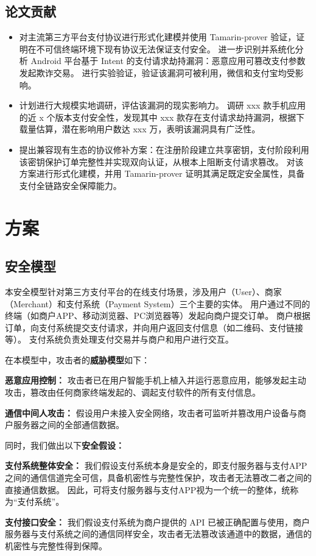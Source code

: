 \documentclass[UTF8]{ctexart}
\begin{document}
\subsection{论文贡献}
\begin{itemize}
    \item 对主流第三方平台支付协议进行形式化建模并使用 Tamarin-prover 验证，证明在不可信终端环境下现有协议无法保证支付安全。
        进一步识别并系统化分析 Android 平台基于 Intent 的支付请求劫持漏洞：恶意应用可篡改支付参数发起欺诈交易。
        进行实验验证，验证该漏洞可被利用，微信和支付宝均受影响。
    \item 计划进行大规模实地调研，评估该漏洞的现实影响力。
        调研 xxx 款手机应用的近 x 个版本支付安全性，发现其中 xxx 款存在支付请求劫持漏洞，根据下载量估算，潜在影响用户数达 xxx 万，表明该漏洞具有广泛性。
    \item 提出兼容现有生态的协议修补方案：在注册阶段建立共享密钥，支付阶段利用该密钥保护订单完整性并实现双向认证，从根本上阻断支付请求篡改。
        对该方案进行形式化建模，并用 Tamarin-prover 证明其满足既定安全属性，具备支付全链路安全保障能力。
\end{itemize}


\section{方案}
\subsection{安全模型}
本安全模型针对第三方支付平台的在线支付场景，涉及用户（User）、商家（Merchant）和支付系统（Payment System）三个主要的实体。
用户通过不同的终端（如商户APP、移动浏览器、PC浏览器等）发起向商户提交订单。
商户根据订单，向支付系统提交支付请求，并向用户返回支付信息（如二维码、支付链接等）。
支付系统负责处理支付交易并与商户和用户进行交互。
 
在本模型中，攻击者的\textbf{威胁模型}如下： 
\begin{compactitem}
    \item \textbf{恶意应用控制：} 攻击者已在用户智能手机上植入并运行恶意应用，能够发起主动攻击，篡改由任何商家终端发起的、调起支付软件的所有支付信息。
    \item \textbf{通信中间人攻击：} 假设用户未接入安全网络，攻击者可监听并篡改用户设备与商户服务器之间的全部通信数据。
\end{compactitem}

同时，我们做出以下\textbf{安全假设：}
\begin{compactitem}
    \item \textbf{支付系统整体安全：}
        我们假设支付系统本身是安全的，即支付服务器与支付APP之间的通信信道完全可信，具备机密性与完整性保护，攻击者无法篡改二者之间的直接通信数据。
        因此，可将支付服务器与支付APP视为一个统一的整体，统称为``支付系统''。
    \item \textbf{支付接口安全：}
        我们假设支付系统为商户提供的 API 已被正确配置与使用，商户服务器与支付系统之间的通信同样安全，攻击者无法篡改该通道中的数据，通信的机密性与完整性得到保障。
\end{compactitem}
\end{document}
